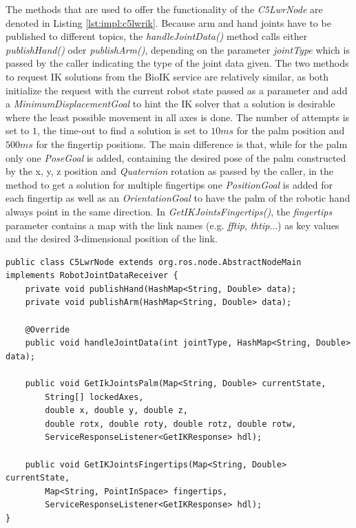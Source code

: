 The methods that are used to offer the functionality of the \textit{C5LwrNode} are denoted in Listing \ref{lst:impl:c5lwrik}. Because arm and hand joints have to be published to different topics, the \textit{handleJointData()} method calls either \textit{publishHand()} oder \textit{publishArm()}, depending on the parameter \textit{jointType} which is passed by the caller indicating the type of the joint data given. The two methods to request IK solutions from the BioIK service are relatively similar, as both initialize the request with the current robot state passed as a parameter and add a \textit{MinimumDisplacementGoal} to hint the IK solver that a solution is desirable where the least possible movement in all axes is done. The number of attempts is set to $1$, the time-out to find a solution is set to $10ms$ for the palm position and $500ms$ for the fingertip positions. The main difference is that, while for the palm only one \textit{PoseGoal} is added, containing the desired pose of the palm constructed by the x, y, z position and \textit{Quaternion} rotation as passed by the caller, in the method to get a solution for multiple fingertips one \textit{PositionGoal} is added for each fingertip as well as an \textit{OrientationGoal} to have the palm of the robotic hand always point in the same direction. In \textit{GetIKJointsFingertips()}, the \textit{fingertips} parameter contains a map with the link names (e.g. \textit{fftip}, \textit{thtip}...) as key values and the desired 3-dimensional position of the link.

\begin{lstlisting}[caption={C5LwrNode interface},label=lst:impl:c5lwrik]
public class C5LwrNode extends org.ros.node.AbstractNodeMain implements RobotJointDataReceiver {
	private void publishHand(HashMap<String, Double> data);
	private void publishArm(HashMap<String, Double> data);
	
	@Override
	public void handleJointData(int jointType, HashMap<String, Double> data);
	
	public void GetIkJointsPalm(Map<String, Double> currentState, 
		String[] lockedAxes, 
		double x, double y, double z, 
		double rotx, double roty, double rotz, double rotw,
		ServiceResponseListener<GetIKResponse> hdl);
	
	public void GetIKJointsFingertips(Map<String, Double> currentState,
		Map<String, PointInSpace> fingertips, 
		ServiceResponseListener<GetIKResponse> hdl);
}

\end{lstlisting}

